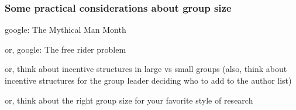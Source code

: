 \documentclass[12pt]{beamer}
\newcommand\gap{\vspace{5mm}}
\begin{document}
\begin{frame}
\frametitle{ Some practical considerations about group size}

\vspace{1cm}

{
google: The Mythical Man Month

\gap

or, google: The free rider problem

\gap

or, think about incentive structures in large vs small groups (also, think about incentive structures for the group leader deciding who to add to the author list)

\gap

or, think about the right group size for your favorite style of research
}

\end{frame} 
\end{document}
